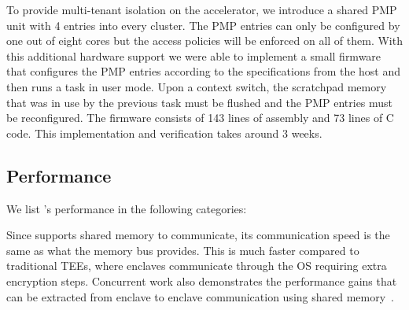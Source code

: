 To provide multi-tenant isolation on the accelerator, we introduce a shared PMP unit with 4 entries into every cluster. The PMP entries can only be configured by one out of eight cores but the access policies will be enforced on all of them. With this additional hardware support we were able to implement a small firmware that configures the PMP entries according to the specifications from the host and then runs a task in user mode. Upon a context switch, the scratchpad memory that was in use by the previous task must be flushed and the PMP entries must be reconfigured. The firmware consists of 143 lines of assembly and 73 lines of C code. This implementation and verification takes around 3 weeks.

\subsection{Performance}
\label{sec:eval:numbers}
We list \name{}'s performance in the following categories:

\setcounter{para}{0}

Since \name{} supports shared memory to communicate, its communication speed is the same as what the memory bus provides. This is much faster compared to traditional TEEs, where enclaves communicate through the OS requiring extra encryption steps. Concurrent work also demonstrates the performance gains that can be extracted from enclave to enclave communication using shared memory~\cite{yu2020elasticlave}.


